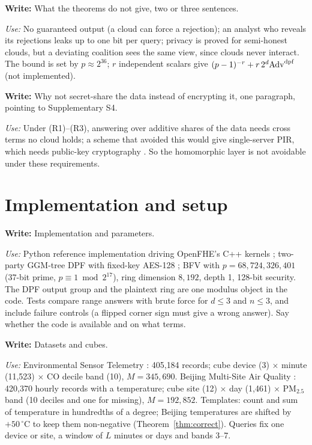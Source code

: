 \documentclass[a4paper,fleqn]{cas-sc}
\newif\ifskeleton \skeletontrue          %
\newcommand{\para}[2]{\ifskeleton\begin{parabox}\textbf{Write:} #1
  \par\smallskip\textit{Use:} #2\end{parabox}\fi}
\begin{document}
\para{What the theorems do not give, two or three sentences.}{No guaranteed
output (a cloud can force a rejection); an analyst who reveals its rejections
leaks up to one bit per query; privacy is proved for semi-honest clouds, but a
deviating coalition sees the same view, since clouds never interact. The bound
is set by $p\approx2^{36}$; $r$ independent scalars give $(p-1)^{-r}+r\,2^d\mathrm{Adv}^{\mathrm{dpf}}$
(not implemented).}

\para{Why not secret-share the data instead of encrypting it, one paragraph,
pointing to Supplementary S4.}{Under (R1)--(R3), answering over additive shares
of the data needs cross terms no cloud holds; a scheme that avoided this would
give single-server PIR, which needs public-key cryptography
\citep{dicrescenzo2000single,kushilevitz1997replication}. So the homomorphic
layer is not avoidable under these requirements.}

\section{Implementation and setup}
\label{sec:setup}

\para{Implementation and parameters.}{Python reference implementation driving
OpenFHE's C++ kernels \citep{openfhe}; two-party GGM-tree DPF with fixed-key
AES-128 \citep{boyle2016function}; BFV with $p=68{,}724{,}326{,}401$ (37-bit
prime, $p\equiv1\bmod2^{17}$), ring dimension $8{,}192$, depth 1, 128-bit
security. The DPF output group and the plaintext ring are one modulus object
in the code. Tests compare range answers with brute force for $d\le3$ and
$n\le3$, and include failure controls (a flipped corner sign must give a wrong
answer). Say whether the code is available and on what terms.}

\para{Datasets and cubes.}{Environmental Sensor Telemetry
\citep{stafford_2020_environmental}: 405{,}184 records; cube device (3) $\times$
minute (11{,}523) $\times$ CO decile band (10), $M=345{,}690$. Beijing
Multi-Site Air Quality \citep{chen2019beijing}: 420{,}370 hourly records with
a temperature; cube site (12) $\times$ day (1{,}461) $\times$ PM$_{2.5}$ band
(10 deciles and one for missing), $M=192{,}852$. Templates: count and sum of
temperature in hundredths of a degree; Beijing temperatures are shifted by
$+50\,^\circ$C to keep them non-negative (Theorem~\ref{thm:correct}). Queries
fix one device or site, a window of $L$ minutes or days and bands 3--7.}
\end{document}
